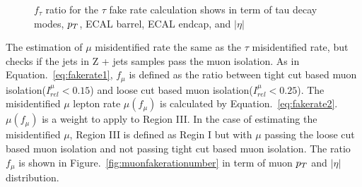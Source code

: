 \begin{figure}[htbp]
     \caption{$f_{\tau}$ ratio for the $\tau$ fake rate calculation shows in term of tau decay modes, $p_{T}$, ECAL barrel, ECAL endcap, and $|\eta|$}
     \label{fig:fakerationumber}
\end{figure}

The estimation of $\mu$ misidentified rate the same as the $\tau$ misidentified rate, but checks if the jets in Z + jets samples pass the muon isolation. As in Equation.~\ref{eq:fakerate1}, $f_{\mu}$ is defined as the ratio between tight cut based muon isolation($I^{\mu}_{rel}<0.15$) and loose cut based muon isolation($I^{\mu}_{rel}<0.25$). The misidentified $\mu$ lepton rate $\mu(f_{\mu})$ is calculated by Equation.~\ref{eq:fakerate2}. $\mu(f_{\mu})$ is a weight to apply to Region III. In the case of estimating the misidentified $\mu$, Region III is defined as Regin I but with $\mu$ passing the loose cut based muon isolation and not passing tight cut based muon isolation. The ratio $f_{\mu}$ is shown in Figure.~\ref{fig:muonfakerationumber} in term of muon $p_{T}$ and $|\eta|$ distribution. 

